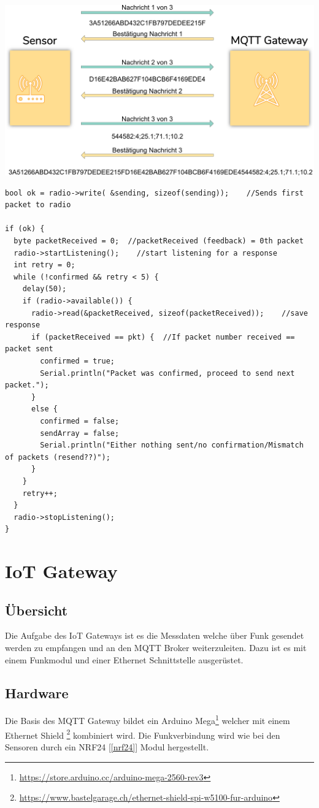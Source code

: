 \documentclass[
  12pt, %
  a4paper, %
  twoside, %
  openany, %
  numbers=noenddot, %
  BCOR=5mm, %
  parskip=half*, %
  thesis, %
]{bfhbook}
\begin{document}
\begin{center}
\includegraphics[width=17cm, left]{Bilder/Funkprotokoll.png}
 \captionsetup{justification=centering}
\label{radioprotocol}
\end{center}
\begin{verbatim}
bool ok = radio->write( &sending, sizeof(sending));    //Sends first packet to radio

if (ok) {
  byte packetReceived = 0;  //packetReceived (feedback) = 0th packet
  radio->startListening();    //start listening for a response
  int retry = 0;
  while (!confirmed && retry < 5) {
    delay(50);
    if (radio->available()) {
      radio->read(&packetReceived, sizeof(packetReceived));    //save response
      if (packetReceived == pkt) {  //If packet number received == packet sent
        confirmed = true;
        Serial.println("Packet was confirmed, proceed to send next packet.");
      }
      else {
        confirmed = false;
        sendArray = false;
        Serial.println("Either nothing sent/no confirmation/Mismatch of packets (resend??)");
      }
    }
    retry++;
  }
  radio->stopListening();
}
\end{verbatim}
\chapter{IoT Gateway}
\section{Übersicht}
Die Aufgabe des IoT Gateways ist es die Messdaten welche über Funk gesendet werden zu empfangen und an den MQTT Broker weiterzuleiten. Dazu ist es mit einem Funkmodul und einer Ethernet Schnittstelle ausgerüstet.
\section{Hardware}
Die Basis des MQTT Gateway bildet ein Arduino Mega\footnote{\url{https://store.arduino.cc/arduino-mega-2560-rev3}} welcher mit einem Ethernet Shield \footnote{\url{https://www.bastelgarage.ch/ethernet-shield-spi-w5100-fur-arduino}} kombiniert wird. Die Funkverbindung wird wie bei den Sensoren durch ein NRF24 [\ref{nrf24}] Modul hergestellt.
\end{document}
